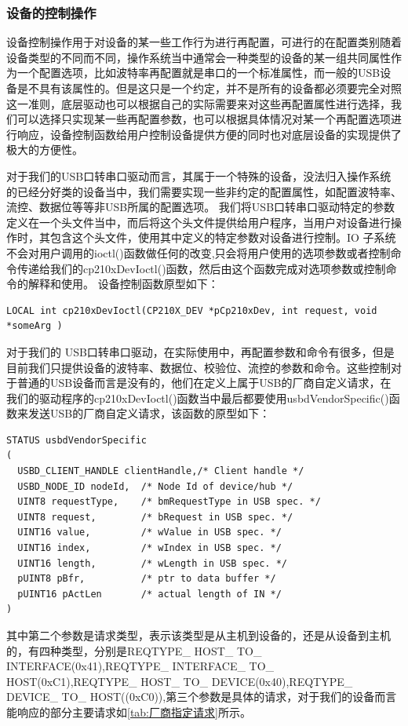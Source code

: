 \subsubsection{设备的控制操作}
	设备控制操作用于对设备的某一些工作行为进行再配置，可进行的在配置类别随着设备类型的不同而不同，操作系统当中通常会一种类型的设备的某一组共同属性作为一个配置选项，比如波特率再配置就是串口的一个标准属性，而一般的USB设备是不具有该属性的。但是这只是一个约定，并不是所有的设备都必须要完全对照这一准则，底层驱动也可以根据自己的实际需要来对这些再配置属性进行选择，我们可以选择只实现某一些再配置参数，也可以根据具体情况对某一个再配置选项进行响应，设备控制函数给用户控制设备提供方便的同时也对底层设备的实现提供了极大的方便性。
	
	对于我们的USB口转串口驱动而言，其属于一个特殊的设备，没法归入操作系统的已经分好类的设备当中，我们需要实现一些非约定的配置属性，如配置波特率、流控、数据位等等非USB所属的配置选项。
	我们将USB口转串口驱动特定的参数定义在一个头文件当中，而后将这个头文件提供给用户程序，当用户对设备进行操作时，其包含这个头文件，使用其中定义的特定参数对设备进行控制。IO 子系统不会对用户调用的ioctl()函数做任何的改变,只会将用户使用的选项参数或者控制命令传递给我们的cp210xDevIoctl()函数，然后由这个函数完成对选项参数或控制命令的解释和使用。
设备控制函数原型如下：
\lstset{language=C}
\begin{lstlisting}
LOCAL int cp210xDevIoctl(CP210X_DEV *pCp210xDev, int request, void *someArg )
\end{lstlisting}

对于我们的 USB口转串口驱动，在实际使用中，再配置参数和命令有很多，但是目前我们只提供设备的波特率、数据位、校验位、流控的参数和命令。这些控制对于普通的USB设备而言是没有的，他们在定义上属于USB的厂商自定义请求，在我们的驱动程序的cp210xDevIoctl()函数当中最后都要使用usbdVendorSpecific()函数来发送USB的厂商自定义请求，该函数的原型如下：
\lstset{language=C}
\begin{lstlisting}
STATUS usbdVendorSpecific
(
  USBD_CLIENT_HANDLE clientHandle,/* Client handle */
  USBD_NODE_ID nodeId,	/* Node Id of device/hub */
  UINT8 requestType,	/* bmRequestType in USB spec. */
  UINT8 request,		/* bRequest in USB spec. */
  UINT16 value,			/* wValue in USB spec. */
  UINT16 index,			/* wIndex in USB spec. */
  UINT16 length,		/* wLength in USB spec. */
  pUINT8 pBfr,			/* ptr to data buffer */
  pUINT16 pActLen		/* actual length of IN */
)
\end{lstlisting}
其中第二个参数是请求类型，表示该类型是从主机到设备的，还是从设备到主机的，有四种类型，分别是REQTYPE\_ HOST\_ TO\_ INTERFACE(0x41),REQTYPE\_ INTERFACE\_ TO\_ HOST(0xC1),REQTYPE\_ HOST\_ TO\_ DEVICE(0x40),REQTYPE\_ DEVICE\_ TO\_ HOST((0xC0)),第三个参数是具体的请求，对于我们的设备而言能响应的部分主要请求如\autoref{tab:厂商指定请求}所示。

